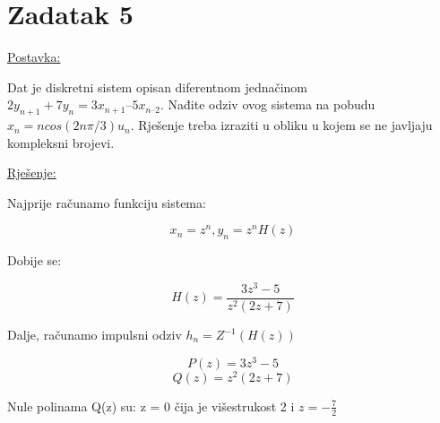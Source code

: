 \documentclass[12pt]{article}
\begin{document}
\newpage

\section*{Zadatak 5\label{Z5}}

\underline{Postavka:}

Dat je diskretni sistem opisan diferentnom jednačinom $2 y_{n+1} + 7 y_n = 3 x_{n+1} – 5 x_{n–2}$. Nađite odziv ovog sistema na pobudu $x_n = n cos (2n \pi / 3) u_n$. Rješenje treba izraziti u obliku u kojem se ne javljaju kompleksni brojevi.

\underline{Rješenje:}

Najprije računamo funkciju sistema:

$$x_n = z^n, y_n = z^n H(z)$$

Dobije se:

$$H (z) = \frac{3z^3 - 5}{z^2 (2z + 7)}$$

Dalje, računamo impulsni odziv $h_n = Z^{-1}(H(z))$

$$P(z) = 3z^3 - 5$$
$$Q(z) = z^2(2z + 7)$$

Nule polinama Q(z) su: z = 0 čija je višestrukost 2 i $z = - \frac{7}{2}$
\end{document}
